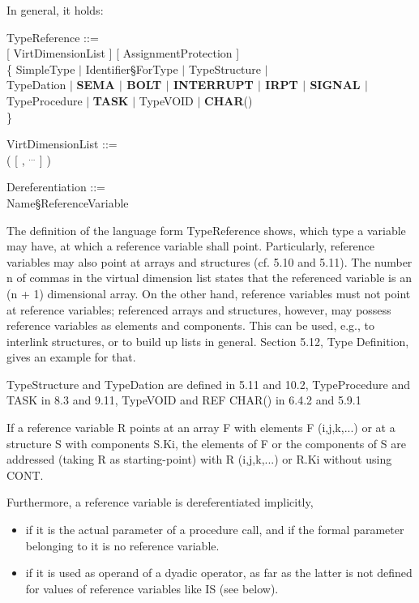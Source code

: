 \begin{tobedone}
In general, it holds:

TypeReference ::=\\
 [ VirtDimensionList ] [ AssignmentProtection ]\\
\x \{ SimpleType $\mid$ Identifier\S ForType $\mid$ TypeStructure $\mid$\\
\x \x TypeDation $\mid$ {\bf SEMA $\mid$ BOLT $\mid$ INTERRUPT $\mid$ IRPT $\mid$ SIGNAL $\mid$} \\
\x \x TypeProcedure $\mid$ {\bf TASK} $\mid$ TypeVOID $\mid$ {\bf CHAR}()\\
\x \}

VirtDimensionList ::=\\
\x ( [ , $^{...}$ ] )

Dereferentiation ::=\\
 Name\S ReferenceVariable

The definition of the language form TypeReference shows, which type a
variable may have, at which a reference variable shall point.
Particularly, reference variables may also point at arrays and
structures (cf. 5.10 and 5.11). The number n of commas in the virtual
dimension list states that the referenced variable is an (n + 1)
dimensional array. On the other hand, reference variables must not point
at reference variables; referenced arrays and structures, however, may
possess reference variables as elements and components. This can be
used, e.g., to interlink structures, or to build up lists in general.
Section 5.12, Type Definition, gives an example for that.

TypeStructure and TypeDation are defined in 5.11 and 10.2, TypeProcedure and 
TASK in 8.3 and 9.11, TypeVOID and REF CHAR() in 6.4.2
and 5.9.1

If a reference variable R points at an array F with elements F
(i,j,k,...) or at a structure S with components S.Ki, the elements of F
or the components of S are addressed (taking R as starting-point) with R
(i,j,k,...) or R.Ki without using CONT.

Furthermore, a reference variable is dereferentiated implicitly,
\begin{itemize}
\item if it is the actual parameter of a procedure call, and if the
formal parameter belonging to it is no reference variable.
\item if it is used as operand of a dyadic operator, as far as the
latter is not defined for values of reference variables like IS (see
below).
\end{itemize}


\end{tobedone}
